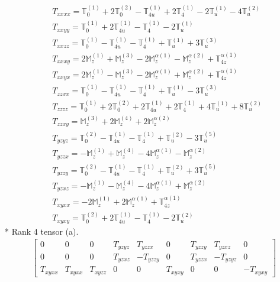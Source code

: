 \documentclass[fleqn,8pt,landscape]{jsarticle}
\begin{document}
\begin{align*}
& T_{xxxx} = \mathbb{T}_{0}^{(1)} + 2 \mathbb{T}_{0}^{(2)} - \mathbb{T}_{4u}^{(1)} + 2 \mathbb{T}_{4}^{(1)} - 2 \mathbb{T}_{u}^{(1)} - 4 \mathbb{T}_{u}^{(2)} \\
& T_{xxyy} = \mathbb{T}_{0}^{(1)} + 2 \mathbb{T}_{4u}^{(1)} - \mathbb{T}_{4}^{(1)} - 2 \mathbb{T}_{u}^{(1)} \\
& T_{xxzz} = \mathbb{T}_{0}^{(1)} - \mathbb{T}_{4u}^{(1)} - \mathbb{T}_{4}^{(1)} + \mathbb{T}_{u}^{(1)} + 3 \mathbb{T}_{u}^{(3)} \\
& T_{xxxy} = 2 \mathbb{M}_{z}^{(1)} + \mathbb{M}_{z}^{(3)} - 2 \mathbb{M}_{z}^{\alpha(1)} - \mathbb{M}_{z}^{\alpha(2)} + \mathbb{T}_{4z}^{\alpha(1)} \\
& T_{xxyx} = 2 \mathbb{M}_{z}^{(1)} - \mathbb{M}_{z}^{(3)} - 2 \mathbb{M}_{z}^{\alpha(1)} + \mathbb{M}_{z}^{\alpha(2)} + \mathbb{T}_{4z}^{\alpha(1)} \\
& T_{zzxx} = \mathbb{T}_{0}^{(1)} - \mathbb{T}_{4u}^{(1)} - \mathbb{T}_{4}^{(1)} + \mathbb{T}_{u}^{(1)} - 3 \mathbb{T}_{u}^{(3)} \\
& T_{zzzz} = \mathbb{T}_{0}^{(1)} + 2 \mathbb{T}_{0}^{(2)} + 2 \mathbb{T}_{4u}^{(1)} + 2 \mathbb{T}_{4}^{(1)} + 4 \mathbb{T}_{u}^{(1)} + 8 \mathbb{T}_{u}^{(2)} \\
& T_{zzxy} = \mathbb{M}_{z}^{(3)} + 2 \mathbb{M}_{z}^{(4)} + 2 \mathbb{M}_{z}^{\alpha(2)} \\
& T_{yzyz} = \mathbb{T}_{0}^{(2)} - \mathbb{T}_{4u}^{(1)} - \mathbb{T}_{4}^{(1)} + \mathbb{T}_{u}^{(2)} - 3 \mathbb{T}_{u}^{(5)} \\
& T_{yzzx} = - \mathbb{M}_{z}^{(1)} + \mathbb{M}_{z}^{(4)} - 4 \mathbb{M}_{z}^{\alpha(1)} - \mathbb{M}_{z}^{\alpha(2)} \\
& T_{yzzy} = \mathbb{T}_{0}^{(2)} - \mathbb{T}_{4u}^{(1)} - \mathbb{T}_{4}^{(1)} + \mathbb{T}_{u}^{(2)} + 3 \mathbb{T}_{u}^{(5)} \\
& T_{yzxz} = - \mathbb{M}_{z}^{(1)} - \mathbb{M}_{z}^{(4)} - 4 \mathbb{M}_{z}^{\alpha(1)} + \mathbb{M}_{z}^{\alpha(2)} \\
& T_{xyxx} = - 2 \mathbb{M}_{z}^{(1)} + 2 \mathbb{M}_{z}^{\alpha(1)} + \mathbb{T}_{4z}^{\alpha(1)} \\
& T_{xyxy} = \mathbb{T}_{0}^{(2)} + 2 \mathbb{T}_{4u}^{(1)} - \mathbb{T}_{4}^{(1)} - 2 \mathbb{T}_{u}^{(2)}
\end{align*}
* Rank 4 tensor (a).
\begin{align*}
\begin{bmatrix} 0 & 0 & 0 & T_{yzyz} & T_{yzzx} & 0 & T_{yzzy} & T_{yzxz} & 0 \\ 0 & 0 & 0 & T_{yzxz} & - T_{yzzy} & 0 & T_{yzzx} & - T_{yzyz} & 0 \\ T_{xyxx} & T_{xyxx} & T_{xyzz} & 0 & 0 & T_{xyxy} & 0 & 0 & - T_{xyxy} \end{bmatrix}
\end{align*}
\end{document}
